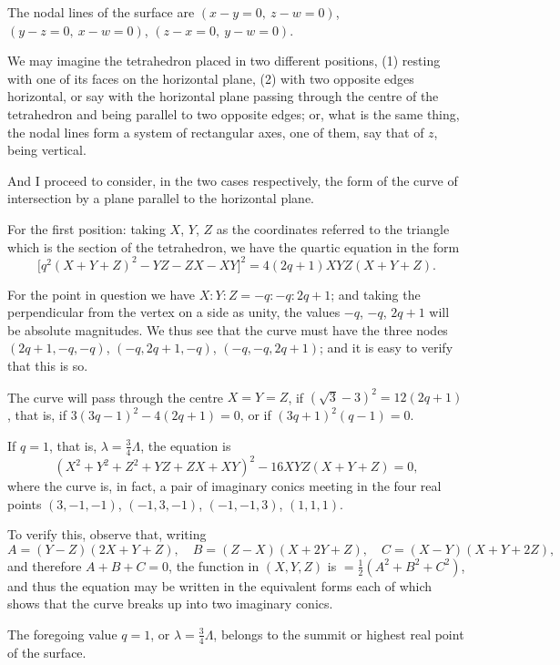 \documentclass[11pt,a4paper]{book}
\begin{document}
The nodal lines of the surface are $(x - y = 0,\ z - w = 0)$, $(y - z = 0,\ x - w = 0)$, $(z - x = 0,\ y - w = 0)$.

\newpage
\setcounter{page}{2}

We may imagine the tetrahedron placed in two different positions, (1) resting with one of its faces on the horizontal plane, (2) with two opposite edges horizontal, or say with the horizontal plane passing through the centre of the tetrahedron and being parallel to two opposite edges; or, what is the same thing, the nodal lines form a system of rectangular axes, one of them, say that of $z$, being vertical.

And I proceed to consider, in the two cases respectively, the form of the curve of intersection by a plane parallel to the horizontal plane.

For the first position: taking $X$, $Y$, $Z$ as the coordinates referred to the triangle which is the section of the tetrahedron, we have the quartic equation in the form
\[
\bigl[q^2(X + Y + Z)^2 - YZ - ZX - XY\bigr]^2 = 4(2q + 1)XYZ(X + Y + Z).
\]

For the point in question we have $X : Y : Z = -q : -q : 2q + 1$; and taking the perpendicular from the vertex on a side as unity, the values $-q$, $-q$, $2q + 1$ will be absolute magnitudes. We thus see that the curve must have the three nodes $(2q+1, -q, -q)$, $(-q, 2q + 1, -q)$, $(-q, -q, 2q + 1)$; and it is easy to verify that this is so.

The curve will pass through the centre $X = Y = Z$, if $(\sqrt{3} - 3)^2 = 12(2q + 1)$, that is, if $3(3q - 1)^2 - 4(2q + 1) = 0$, or if $(3q + 1)^2(q - 1) = 0$.

If $q = 1$, that is, $\lambda = \tfrac{3}{4}\Lambda$, the equation is
\[
(X^2 + Y^2 + Z^2 + YZ + ZX + XY)^2 - 16XYZ(X + Y + Z) = 0,
\]
where the curve is, in fact, a pair of imaginary conics meeting in the four real points $(3, -1, -1)$, $(-1, 3, -1)$, $(-1, -1, 3)$, $(1, 1, 1)$.

To verify this, observe that, writing
\[
A = (Y - Z)(2X + Y + Z),\quad B = (Z - X)(X + 2Y + Z),\quad C = (X - Y)(X + Y + 2Z),
\]
and therefore $A + B + C = 0$, the function in $(X, Y, Z)$ is $= \tfrac{1}{2}(A^2 + B^2 + C^2)$, and thus the equation may be written in the equivalent forms each of which shows that the curve breaks up into two imaginary conics.

The foregoing value $q = 1$, or $\lambda = \tfrac{3}{4}\Lambda$, belongs to the summit or highest real point of the surface.
\end{document}
